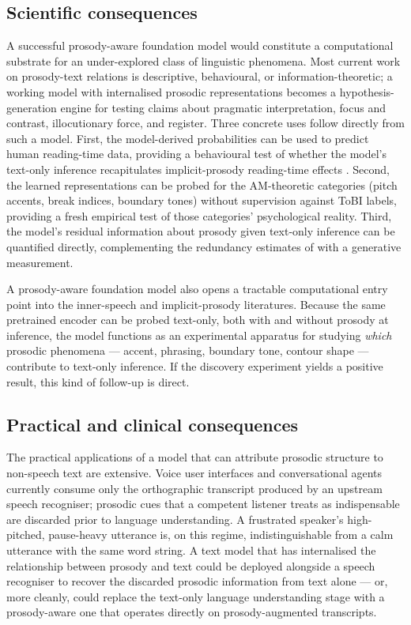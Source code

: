 \documentclass[11pt,letterpaper]{article}
\begin{document}
\subsection{Scientific consequences}

A successful prosody-aware foundation model would constitute a computational substrate for an under-explored class of linguistic phenomena. Most current work on prosody-text relations is descriptive, behavioural, or information-theoretic; a working model with internalised prosodic representations becomes a hypothesis-generation engine for testing claims about pragmatic interpretation, focus and contrast, illocutionary force, and register. Three concrete uses follow directly from such a model. First, the model-derived probabilities can be used to predict human reading-time data, providing a behavioural test of whether the model's text-only inference recapitulates implicit-prosody reading-time effects \citep{breen2014review, glushko2022}. Second, the learned representations can be probed for the AM-theoretic categories (pitch accents, break indices, boundary tones) without supervision against ToBI labels, providing a fresh empirical test of those categories' psychological reality. Third, the model's residual information about prosody given text-only inference can be quantified directly, complementing the redundancy estimates of \citet{wolf2023, wolf2025} with a generative measurement.

A prosody-aware foundation model also opens a tractable computational entry point into the inner-speech and implicit-prosody literatures. Because the same pretrained encoder can be probed text-only, both with and without prosody at inference, the model functions as an experimental apparatus for studying \emph{which} prosodic phenomena --- accent, phrasing, boundary tone, contour shape --- contribute to text-only inference. If the discovery experiment yields a positive result, this kind of follow-up is direct.

\subsection{Practical and clinical consequences}

The practical applications of a model that can attribute prosodic structure to non-speech text are extensive. Voice user interfaces and conversational agents currently consume only the orthographic transcript produced by an upstream speech recogniser; prosodic cues that a competent listener treats as indispensable are discarded prior to language understanding. A frustrated speaker's high-pitched, pause-heavy utterance is, on this regime, indistinguishable from a calm utterance with the same word string. A text model that has internalised the relationship between prosody and text could be deployed alongside a speech recogniser to recover the discarded prosodic information from text alone --- or, more cleanly, could replace the text-only language understanding stage with a prosody-aware one that operates directly on prosody-augmented transcripts.
\end{document}
